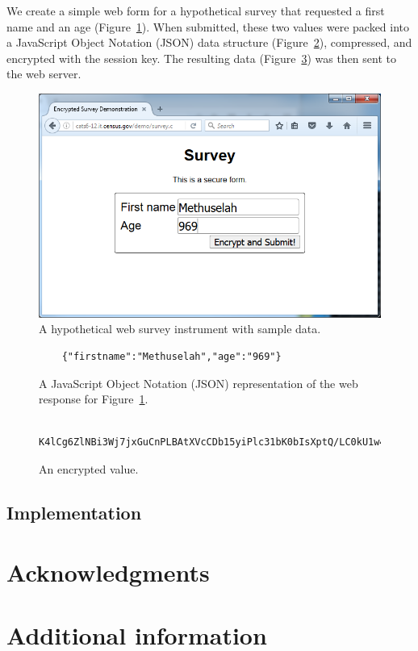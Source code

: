 \documentclass[fleqn,10pt]{wlscirep}
\begin{document}
We create a simple web form for a hypothetical survey that requested a
first name and an age (Figure~\ref{survey}). When submitted, these two
values were packed into a JavaScript Object Notation (JSON) data
structure (Figure~\ref{json}), compressed, and encrypted with the session key. The
resulting data (Figure~\ref{encrypted}) was then sent to the web server.

\begin{figure}
  \centering
  \includegraphics[width=.5\linewidth]{art/figure1}
  \caption{A hypothetical web survey instrument with sample
    data.}\label{survey}
  \end{figure}

\begin{figure}
  \begin{Verbatim}
    {"firstname":"Methuselah","age":"969"}
  \end{Verbatim}
  \caption{A JavaScript Object Notation (JSON) representation of the web response for Figure~\ref{survey}.}\label{json}
\end{figure}

\begin{figure}
  \begin{Verbatim}
    K4lCg6ZlNBi3Wj7jxGuCnPLBAtXVcCDb15yiPlc31bK0bIsXptQ/LC0kU1w4jdop
  \end{Verbatim}
  \caption{An encrypted value.}\label{encrypted}
\end{figure}


\subsection{Implementation}



%


\section{Acknowledgments}

\section{Additional information}
\end{document}
